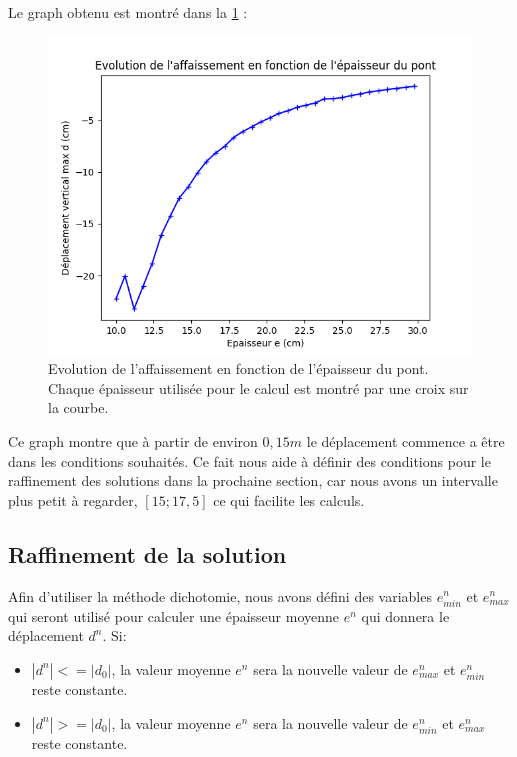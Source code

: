 \documentclass{article}
\begin{document}
    Le graph obtenu est montré dans la \ref{fig:graph} :
    \begin{figure}[H]        
    \begin{center}
	
        \includegraphics[width=12cm]{imgs/graph.png}
        \caption{Evolution de l'affaissement en fonction de l'épaisseur du pont. Chaque épaisseur utilisée pour le calcul est montré par une croix sur la courbe.}
        \label{fig:graph}
    
	\end{center}
    \end{figure}
    Ce graph montre que à partir de environ $0,15 m$ le déplacement commence a être dans les conditions souhaités. Ce fait nous aide à définir des conditions pour le raffinement des solutions dans la prochaine section, car nous avons un intervalle plus petit à regarder, $[15; 17,5]$ ce qui facilite les calculs.
    \subsection{Raffinement de la solution}
    
    Afin d'utiliser la méthode dichotomie, nous avons défini des variables $e^n_{min}$ et $e^n_{max}$  qui seront utilisé pour calculer une épaisseur moyenne $e^n$ 	qui donnera le déplacement $d^n$. Si:
    
    \begin{itemize}
    \item $|d^n| <= |d_0|$, la valeur moyenne $e^n$ sera la nouvelle valeur de $e^n_{max}$ et $e^n_{min}$ reste constante.
    \item $|d^n| >= |d_0|$, la valeur moyenne $e^n$ sera la nouvelle valeur de $e^n_{min}$ et $e^n_{max}$ reste constante.
    \end{itemize}
   
\end{document}
